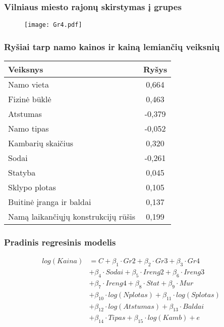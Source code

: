 \documentclass[utf8,hyperref={unicode}]{beamer}
\theoremstyle{change}\newtheorem{teorema}{Teiginys}
\theoremstyle{change}\newtheorem{salyga}{}
\begin{document}
\begin{frame}
    \frametitle{Vilniaus miesto rajonų skirstymas į grupes}
    \begin{figure}[H]
  \centering
    \texttt{[image: Gr4.pdf]} 
\end{figure}
\end{frame}

\begin{frame}
    \frametitle{ Ryšiai tarp namo kainos ir kainą lemiančių veiksnių}
  \begin{table}[H]
        \begin{center}
        \begin{tabular}{ | p{} | c |}
       \hline
       \textbf{Veiksnys} & \textbf{Ryšys} \\ \hline
    Namo vieta & 0,664\\ \hline
    Fizinė būklė & 0,463 \\ \hline
    Atstumas & -0,379 \\ \hline
    Namo tipas & -0,052 \\ \hline
    Kambarių skaičius & 0,320 \\ \hline
    Sodai & -0,261 \\ \hline
    Statyba & 0,045 \\ \hline
    Sklypo plotas & 0,105 \\ \hline
    Buitinė įranga ir baldai & 0,137 \\ \hline
    Namą laikančiųjų konstrukcijų rūšis & 0,199 \\ \hline
    \end{tabular}
\end{center}
\end{table} 
\end{frame}

\begin{frame}
    \frametitle{Pradinis regresinis modelis}   
\begin{align*}
log(Kaina)&=C+\beta_1\cdot Gr2+\beta_2\cdot  Gr3+\beta_3\cdot Gr4\\&+\beta_4\cdot Sodai+\beta_5\cdot Ireng2+\beta_6\cdot Ireng3\\&+\beta_7\cdot Ireng4+\beta_8\cdot Stat+\beta_9\cdot Mur\\&+\beta_{10}\cdot log(Nplotas)+
\beta_{11}\cdot log(Splotas)\\&+\beta_{12}\cdot log(Atstumas)+ \beta_{13}\cdot Baldai\\&+\beta_{14}\cdot Tipas+\beta_{15}\cdot log(Kamb)+e
\end{align*}

\end{frame}
\end{document}
